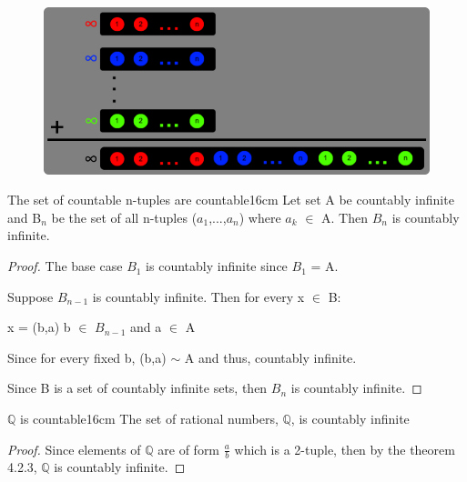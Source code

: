 	\begin{figure}[h]
		\centering
		\includegraphics[scale=0.32]{Images/4.2.2.png}
	\end{figure}



	\begin{wtheorem}{The set of countable n-tuples are countable}{16cm}
		Let set A be countably infinite and B$_n$ be the set of all
		n-tuples ($a_1$,...,$a_n$) where $a_k$ $\in$ A.
		Then $B_n$ is countably infinite.
	\end{wtheorem}
	
	\begin{proof}
		The base case $B_1$ is countably infinite since $B_1$ = A.

		Suppose $B_{n-1}$ is countably infinite. Then for every x $\in$ B:

		\qquad x = (b,a) \qquad \qquad b $\in$ $B_{n-1}$ and a $\in$ A

		Since for every fixed b, (b,a) $\sim$ A and thus, countably infinite.

		Since B is a set of countably infinite sets, then $B_{n}$
		is countably infinite.
	\end{proof}
	
	\newpage
	
	
	
	\begin{wtheorem}{$\mathbb{Q}$ is countable}{16cm}
		The set of rational numbers, $\mathbb{Q}$, is countably infinite 
	\end{wtheorem}
	
	\begin{proof}
		Since elements of $\mathbb{Q}$ are of form $\frac{a}{b}$ which is a
		2-tuple, then by the {\color{red} theorem 4.2.3},
		$\mathbb{Q}$ is countably infinite. 
	\end{proof}

	\vspace{0.1cm}

